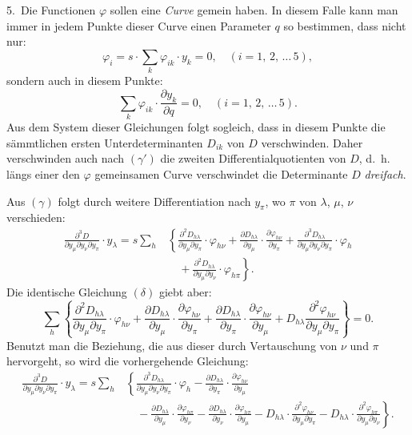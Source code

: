 \documentclass{article}
\begin{document}
5.~Die Functionen $\varphi$ sollen eine \emph{Curve} gemein haben. In diesem Falle kann man immer in jedem Punkte dieser Curve einen Parameter $q$ so bestimmen, dass nicht nur:
\[
\varphi_i = s \cdot \sum_k \varphi_{ik} \cdot y_k = 0, \quad (i = 1,\, 2,\, \dots\, 5),
\]
sondern auch in diesem Punkte:
\[
\sum_k \varphi_{ik} \cdot \frac{\partial y_k}{\partial q} = 0, \quad (i = 1,\, 2,\, \dots\, 5).
\]
Aus dem System dieser Gleichungen folgt sogleich, dass in diesem Punkte die sämmtlichen ersten Unterdeterminanten $D_{ik}$ von $D$ verschwinden. Daher verschwinden auch nach $(\gamma')$ die zweiten Differentialquotienten von $D$, d.~h. längs einer den $\varphi$ gemeinsamen Curve verschwindet die Determinante $D$ \emph{dreifach}.

Aus $(\gamma)$ folgt durch weitere Differentiation nach $y_\pi$, wo $\pi$ von $\lambda$, $\mu$, $\nu$ verschieden:
\[
\begin{aligned}
\frac{\partial^3 D}{\partial y_\mu \partial y_\nu \partial y_\pi} \cdot y_\lambda = s \sum_h &\left\{\frac{\partial^2 D_{h\lambda}}{\partial y_\mu \partial y_\pi} \cdot \varphi_{h\nu} + \frac{\partial D_{h\lambda}}{\partial y_\mu} \cdot \frac{\partial \varphi_{h\nu}}{\partial y_\pi} + \frac{\partial^3 D_{h\lambda}}{\partial y_\mu \partial y_\nu \partial y_\pi} \cdot \varphi_h \right.\\
&\quad \left.{}+ \frac{\partial^2 D_{h\lambda}}{\partial y_\mu \partial y_\nu} \cdot \varphi_{h\pi}\right\} .
\end{aligned}
\]
Die identische Gleichung $(\delta)$ giebt aber:
\[
\sum_h \left\{\frac{\partial^2 D_{h\lambda}}{\partial y_\mu \partial y_\pi} \cdot \varphi_{h\nu} + \frac{\partial D_{h\lambda}}{\partial y_\mu} \cdot \frac{\partial \varphi_{h\nu}}{\partial y_\pi} + \frac{\partial D_{h\lambda}}{\partial y_\pi} \cdot \frac{\partial \varphi_{h\nu}}{\partial y_\mu} + D_{h\lambda} \frac{\partial^2 \varphi_{h\nu}}{\partial y_\mu \partial y_\pi}\right\} = 0.
\]
Benutzt man die Beziehung, die aus dieser durch Vertauschung von $\nu$ und $\pi$ hervorgeht, so wird die vorhergehende Gleichung:
\[
\begin{aligned}
\frac{\partial^3 D}{\partial y_\mu \partial y_\nu \partial y_\pi} \cdot y_\lambda = s \sum_h &\left\{\frac{\partial^3 D_{h\lambda}}{\partial y_\mu \partial y_\nu \partial y_\pi} \cdot \varphi_h - \frac{\partial D_{h\lambda}}{\partial y_\pi} \cdot \frac{\partial \varphi_{h\nu}}{\partial y_\mu}\right. \\
&\quad{}- \left.\frac{\partial D_{h\lambda}}{\partial y_\mu} \cdot \frac{\partial \varphi_{h\pi}}{\partial y_\nu} - \frac{\partial D_{h\lambda}}{\partial y_\nu} \cdot \frac{\partial \varphi_{h\pi}}{\partial y_\mu} - D_{h\lambda} \cdot \frac{\partial^2 \varphi_{h\nu}}{\partial y_\mu \partial y_\pi} - D_{h\lambda} \cdot \frac{\partial^2 \varphi_{h\pi}}{\partial y_\mu \partial y_\nu}\right\} .
\end{aligned}
\tag{$\varepsilon$}
\]
\end{document}
